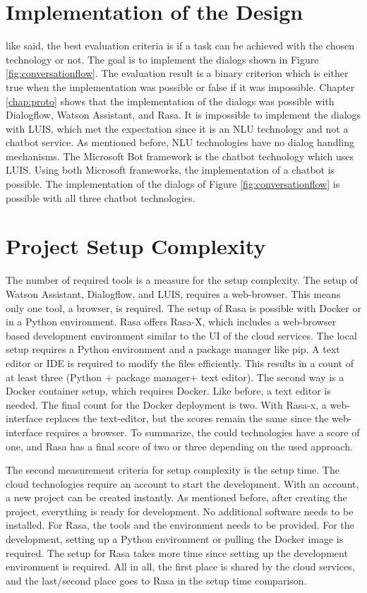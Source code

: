 \section*{Implementation of the Design}
like \citet{singhbuilding} said, the best evaluation criteria is if a task can be achieved with the chosen technology or not.
The goal is to implement the dialogs shown in Figure \ref{fig:conversationflow}.
The evaluation result is a binary criterion which is either true when the implementation was possible or false if it was impossible.
Chapter \ref{chap:proto} shows that the implementation of the dialogs was possible with Dialogflow, Watson Assistant, and Rasa.
It is impossible to implement the dialogs with LUIS, which met the expectation since it is an NLU technology and not a chatbot service. 
As mentioned before, NLU technologies have no dialog handling mechanisms.
The Microsoft Bot framework is the chatbot technology which uses LUIS.
Using both Microsoft frameworks, the implementation of a chatbot is possible.
The implementation of the dialogs of Figure \ref{fig:conversationflow} is possible with all 
three chatbot technologies.

\section*{Project Setup Complexity} \label{sec:setup_complex}
The number of required tools is a measure for the setup complexity.
The setup of Watson Assistant, Dialogflow, and LUIS, requires a web-browser.
This means only one tool, a browser, is required.
The setup of Rasa is possible with Docker or in a Python environment.
Rasa offers Rasa-X, which includes a web-browser based development environment similar to the UI of the cloud services.
The local setup requires a Python environment and a package manager like pip.
A text editor or IDE is required to modify the files efficiently.
This results in a count of at least three (Python + package manager+ text editor).
The second way is a Docker container setup, which requires Docker.
Like before, a text editor is needed.
The final count for the Docker deployment is two.
With Rasa-x, a web-interface replaces the text-editor, but the scores remain the same since the web-interface requires a browser.
To summarize, the could technologies have a score of one, and Rasa has a final score of two or three depending on the used approach.

The second measurement criteria for setup complexity is the setup time.
The cloud technologies require an account to start the development.
With an account, a new project can be created instantly.
As mentioned before, after creating the project, everything is ready for development.
No additional software needs to be installed.
For Rasa, the tools and the environment needs to be provided.
For the development, setting up a Python environment or pulling the Docker image is required.
The setup for Rasa takes more time since setting up the development environment is required.
All in all, the first place is shared by the cloud services, and the last/second place goes to Rasa in the setup time comparison.

